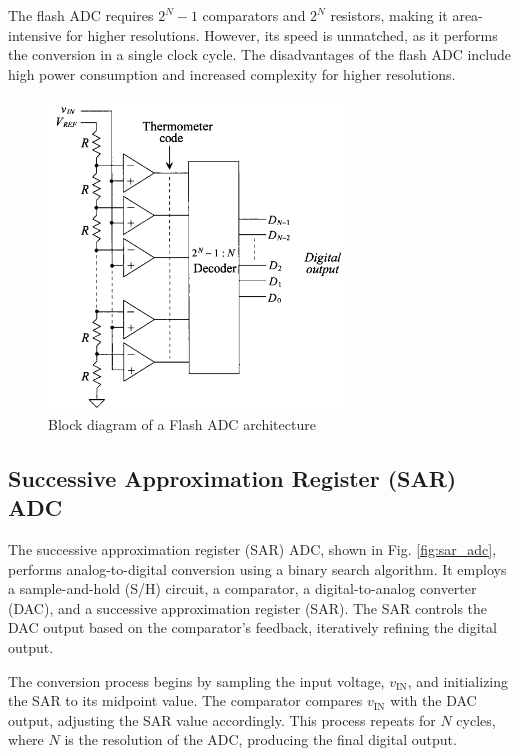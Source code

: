 The flash ADC requires $2^N - 1$ comparators and $2^N$ resistors, making it area-intensive for higher resolutions. However, its speed is unmatched, as it performs the conversion in a single clock cycle. The disadvantages of the flash ADC include high power consumption and increased complexity for higher resolutions.

\begin{figure}[H]
	\centering
	\includegraphics[width=0.7\textwidth]{figs/flash_adc.png}
	\caption{Block diagram of a Flash ADC architecture}
	\label{fig:flash_adc}
	\vspace{0.5cm}
\end{figure}
\subsection{Successive Approximation Register (SAR) ADC}
The successive approximation register (SAR) ADC, shown in Fig. \ref{fig:sar_adc}, performs analog-to-digital conversion using a binary search algorithm. It employs a sample-and-hold (S/H) circuit, a comparator, a digital-to-analog converter (DAC), and a successive approximation register (SAR). The SAR controls the DAC output based on the comparator's feedback, iteratively refining the digital output.

The conversion process begins by sampling the input voltage, $v_{\text{IN}}$, and initializing the SAR to its midpoint value. The comparator compares $v_{\text{IN}}$ with the DAC output, adjusting the SAR value accordingly. This process repeats for $N$ cycles, where $N$ is the resolution of the ADC, producing the final digital output.

